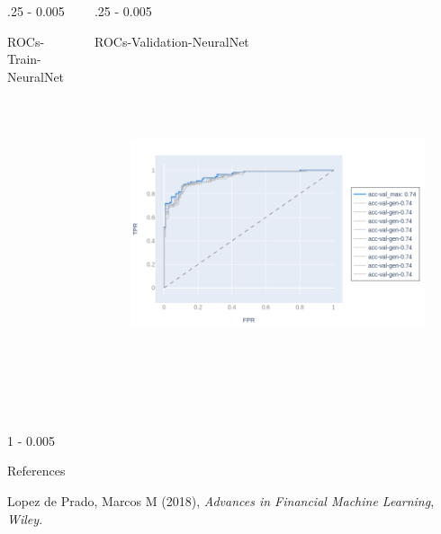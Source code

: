 \documentclass{postertheme}\usepackage[]{graphicx}\usepackage[]{color}
\begin{document}
\begin{frame}
\begin{columns}[onlytextwidth]
\begin{column}{.25 \textwidth - 0.005 \textwidth}
\begin{block}{ROCs-Train-NeuralNet}
    \end{block}
  \end{column}
  
  \begin{column}{.25 \textwidth - 0.005 \textwidth}
    \begin{block}{ROCs-Validation-NeuralNet}
        
      \begin{figure}
        \includegraphics[width=18cm, height=10cm, keepaspectratio=true]{figures/plot-rocs-logistic-val.png}
      \end{figure}
        
    \end{block}
  \end{column}
  
\end{columns}


\begin{columns}[onlytextwidth]
  
  \begin{column}{1 \textwidth - 0.005 \textwidth}
    \begin{block}{References} \footnotesize
    
    \begin{thebibliography}{02}
              Lopez de Prado, Marcos M (2018), \textit{Advances in Financial Machine Learning}, \emph{Wiley}.


\end{thebibliography}
\end{block}
\end{column}
\end{columns}
\end{frame}
\end{document}
